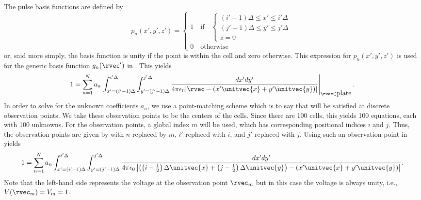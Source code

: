 The pulse basis functions are defined by
\begin{equation}
  p_n(x',y',z') = \left\{
  \begin{array}{l}
    1\quad \mbox{if} \quad\left\{
      \begin{array}{l}
        (i'-1)\Delta \leq x' \leq i'\Delta \\
        (j'-1)\Delta \leq y' \leq j'\Delta \\
        z=0
      \end{array}\right. \\
    0\quad \mbox{otherwise}
  \end{array}\right.
  \label{eq:pulseDetails}
\end{equation}
or, said more simply, the basis function is unity if the point is
within the cell and zero otherwise.  This expression for
$p_n(x',y',z')$ is used for the generic basis function $g_n(\rvec')$ in
.  This yields
\begin{equation}
 1 = 
\sum_{n=1}^N a_n 
  \left.
    \int_{x'=(i'-1)\Delta}^{i'\Delta}\int_{y'=(j'-1)\Delta}^{j'\Delta}
  \frac{dx'dy'}{4\pi\epsilon_0|\rvec-(x'\unitvec{x}+y'\unitvec{y})|}
  \right|_{\rvec\in{\mbox{plate}}}.
  \label{eq:vPlateBasisI}
\end{equation}
In order to solve for the unknown coefficients $a_n$, we use a
point-matching scheme which is to say that 
will be satisfied at discrete observation points.  We take these
observation points to be the centers of the cells.  Since there are
100 cells, this yields 100 equations, each with 100 unknowns.  For the
observation points, a global index $m$ will be used, which has
corresponding positional indices $i$ and $j$.  Thus, the observation
points are given by  with $n$ replaced by $m$, $i'$
replaced with $i$, and $j'$ replaced with $j$.  Using such an
observation point in
 yields
\begin{equation}
1 = 
\sum_{n=1}^N a_n 
  \int_{x'=(i'-1)\Delta}^{i'\Delta}\int_{y'=(j'-1)\Delta}^{j'\Delta}
  \frac{dx'dy'}{4\pi\epsilon_0
                \left|\left(\left(i-\frac{1}{2}\right)\Delta\unitvec{x}
                +\left(j-\frac{1}{2}\right)\Delta\unitvec{y}\right)
                 -(x'\unitvec{x}+y'\unitvec{y})\right|}.
  \label{eq:vPlateBasisII}
\end{equation}
Note that the left-hand side represents the voltage at the observation
point $\rvec_m$ but in this case the voltage is always unity, i.e.,
$V(\rvec_m)=V_m=1$.

